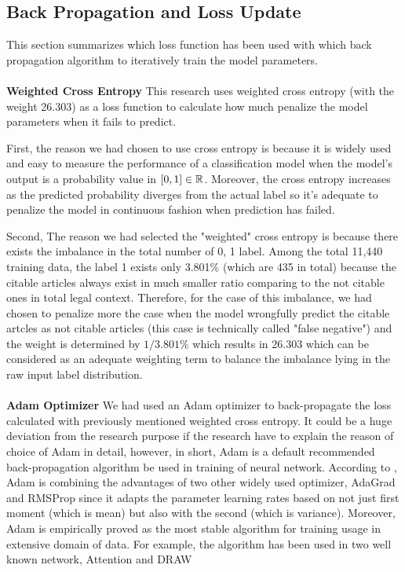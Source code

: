 \documentclass[sigconf]{acmart}
\begin{document}
\subsection{Back Propagation and Loss Update}
This section summarizes which loss function has been used with which back propagation algorithm to iteratively train the model parameters.\\\\

\textbf{Weighted Cross Entropy} This research uses weighted cross entropy (with the weight 26.303) as a loss function to calculate how much penalize the model parameters when it fails to predict. 

First, the reason we had chosen to use cross entropy is because it is widely used and easy to measure the performance of a classification model when the model's output is a probability value in \([0, 1] \in \Bbb{R}\). Moreover, the cross entropy increases as the predicted probability diverges from the actual label so it's adequate to penalize the model in continuous fashion when prediction has failed. 

Second, The reason we had selected the "weighted" cross entropy is because there exists the imbalance in the total number of 0, 1 label. Among the total 11,440 training data, the label 1 exists only 3.801\% (which are 435 in total) because the citable articles always exist in much smaller ratio comparing to the not citable ones in total legal context. Therefore, for the case of this imbalance, we had chosen to penalize more the case when the model wrongfully predict the citable artcles as not citable articles (this case is technically called "false negative") and the weight is determined by \(1/3.801\%\) which results in 26.303 which can be considered as an adequate weighting term to balance the imbalance lying in the raw input label distribution.\\\\
\textbf{Adam Optimizer} We had used an Adam optimizer \cite{DBLP:journals/corr/Kingma15} to back-propagate the loss calculated with previously mentioned weighted cross entropy. It could be a huge deviation from the research purpose if the research have to explain the reason of choice of Adam in detail, however, in short, Adam is a default recommended back-propagation algorithm be used in training of neural network. According to \cite{DBLP:journals/corr/Kingma15}, Adam is combining the advantages of two other widely used optimizer, AdaGrad and RMSProp since it adapts the parameter learning rates based on not just first moment (which is mean) but also with the second (which is variance). Moreover, Adam is empirically proved as the most stable algorithm for training usage in extensive domain of data. For example, the algorithm has been used in two well known network, Attention \cite{DBLP:journals/corr/Karol15} and DRAW \cite{DBLP:journals/corr/Kelvin16}
\end{document}
